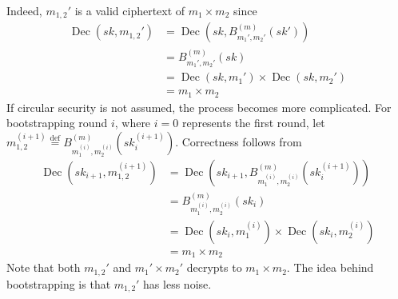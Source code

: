 Indeed, $m_{1,2}'$ is a valid ciphertext of $m_1 \times m_2$ since 
\begin{equation*}
    \begin{aligned}
        \operatorname{Dec}(sk, m_{1,2}') &= \operatorname{Dec}(sk, B_{m_1',m_2'}^{(m)}(sk'))\\
        &= B_{m_1',m_2'}^{(m)}(sk) \\
        &= \operatorname{Dec}(sk, m_1') \times \operatorname{Dec}(sk, m_2')\\
        &= m_1 \times m_2
    \end{aligned}
\end{equation*}
If circular security is not assumed, the process becomes more complicated. For bootstrapping round $i$, where $i = 0$ represents the first round, let $m_{1,2}^{(i+1)} \stackrel{\mathrm{def}}{=} B_{m_1^{(i)},m_2^{(i)}}^{(m)}(sk_i^{(i+1)})$. Correctness follows from
\begin{equation*}
    \begin{aligned}
        \operatorname{Dec}(sk_{i+1}, m_{1,2}^{(i+1)}) &= \operatorname{Dec}(sk_{i+1}, B_{m_1^{(i)},m_2^{(i)}}^{(m)}(sk_i^{(i+1)})) \\
        &= B_{m_1^{(i)},m_2^{(i)}}^{(m)}(sk_i)\\
        &= \operatorname{Dec}(sk_i, m_1^{(i)}) \times \operatorname{Dec}(sk_i, m_2^{(i)})\\
        &= m_1 \times m_2
    \end{aligned}
\end{equation*}
Note that both $m_{1,2}'$ and $m_1' \times m_2'$ decrypts to $m_1 \times m_2$. The idea behind bootstrapping is that $m_{1,2}'$ has less noise.

